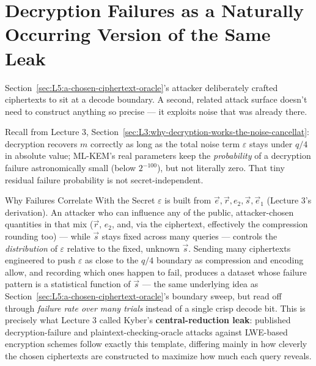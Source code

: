 \section{Decryption Failures as a Naturally Occurring Version of the Same Leak}
\label{sec:L5:decryption-failures}

Section~\ref{sec:L5:a-chosen-ciphertext-oracle}'s attacker deliberately crafted ciphertexts to sit at a decode boundary. A second, related attack surface doesn't need to construct anything so precise --- it exploits noise that was already there.

Recall from Lecture 3, Section~\ref{sec:L3:why-decryption-works-the-noise-cancellat}: decryption recovers $m$ correctly as long as the total noise term $\varepsilon$ stays under $q/4$ in absolute value; ML-KEM's real parameters keep the \emph{probability} of a decryption failure astronomically small (below $2^{-100}$), but not literally zero. That tiny residual failure probability is not secret-independent.

\begin{rmkbox}{Why Failures Correlate With the Secret}
$\varepsilon$ is built from $\vec e, \vec r, e_2, \vec s, \vec e_1$ (Lecture 3's derivation). An attacker who can influence any of the public, attacker-chosen quantities in that mix ($\vec r$, $e_2$, and, via the ciphertext, effectively the compression rounding too) --- while $\vec s$ stays fixed across many queries --- controls the \emph{distribution} of $\varepsilon$ relative to the fixed, unknown $\vec s$. Sending many ciphertexts engineered to push $\varepsilon$ as close to the $q/4$ boundary as compression and encoding allow, and recording which ones happen to fail, produces a dataset whose failure pattern is a statistical function of $\vec s$ --- the same underlying idea as Section~\ref{sec:L5:a-chosen-ciphertext-oracle}'s boundary sweep, but read off through \emph{failure rate over many trials} instead of a single crisp decode bit. This is precisely what Lecture 3 called Kyber's \textbf{central-reduction leak}: published decryption-failure and plaintext-checking-oracle attacks against LWE-based encryption schemes follow exactly this template, differing mainly in how cleverly the chosen ciphertexts are constructed to maximize how much each query reveals.
\end{rmkbox}

